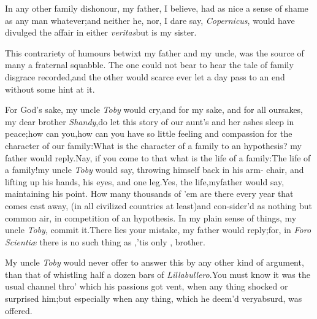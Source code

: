 \documentclass[twoside]{article}
\begin{document}
In any other family dishonour, my father, I believe, had as nice
a sense of shame as any man whatever;\tsh and neither he,
nor, I dare say, \textit{Copernicus}, would have divulged the affair
in either 
\textit{veritas}\tsk but  is my sister.

This contrariety of humours betwixt my father and my uncle, was
the source of many a fraternal squabble. The one could not bear to
hear the tale of family disgrace recorded,\tsh and the
other would scarce ever let a day pass to an end without some hint
at it.

For God’s sake, my uncle \textit{Toby} would
cry,\tsh and for my sake, and for all our\break sakes, my dear
brother \textit{Shandy},\tsk do let this story of our aunt’s
and her ashes sleep in peace;\tsk how can
you,\tsh\break how can you have so little feeling and compassion
for the character of our fa\-mily:\tsh What is the character
of a fa\-mily to an hypothesis? my father would\break
reply.\tsh Nay, if you come to that\tsk
\break what is the
life of a family:\tsh The life of a family!\tsk my uncle
\textit{Toby} would say, throwing himself back in his arm-
chair, and
lifting up his hands, his eyes, and one
leg.\tsh Yes, the life,\tsh my\break father would say,
maintaining his point. How many thousands of ’em are there
every year that comes cast away, (in all civilized countries at
least)\tsh and con-\break sider’d as nothing but common air, in
competition of an hypothesis. In my plain sense of things, my uncle
\textit{Toby},\break 
{}
commit it.\tsh There
lies your mistake, my father would reply;\tsh for, in
\textit{Foro Scientiæ} there is no such thing as
,\tsh ’tis only
, brother.

My uncle \textit{Toby} would never offer to answer this by any
other kind of argument, than that of whistling half a dozen bars of
\textit{Lillabullero}.\tsh You must know
it was the usual
channel thro’ which his passions got vent, when any thing
shock\-ed or surprised him;\tsh but especially when any
thing, which he deem’d very\break absurd, was offered.
\end{document}
